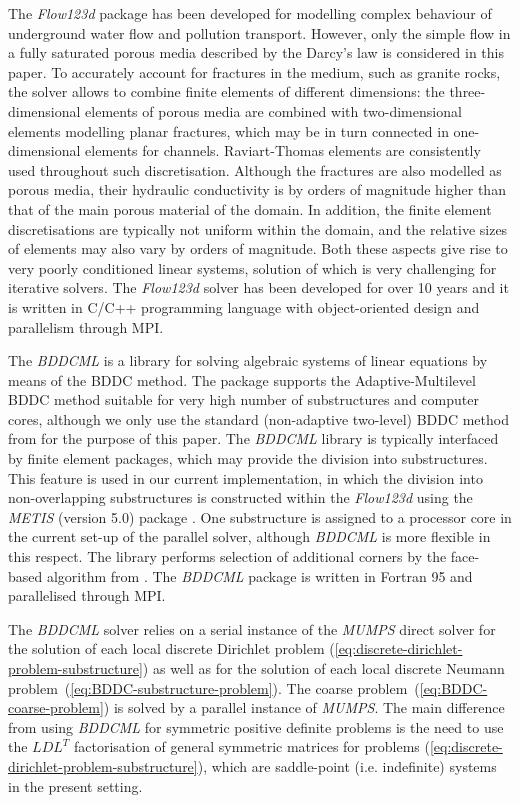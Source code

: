 The \textsl{Flow123d} package has been developed for modelling complex
behaviour of underground water flow and pollution transport. However, only the
simple flow in a fully saturated porous media described by the Darcy's law is
considered in this paper. To accurately account for fractures in the medium,
such as granite rocks, the solver allows to combine finite elements of
different dimensions: the three-dimensional elements of porous media are
combined with two-dimensional elements modelling planar fractures, which may be in
turn connected in one-dimensional elements for channels. Raviart-Thomas
elements are consistently used throughout such discretisation. Although the
fractures are also modelled as porous media, their hydraulic conductivity is by
orders of magnitude higher than that of the main porous material of the
domain. In addition, the finite element discretisations are typically not
uniform within the domain, and the relative sizes of elements may also vary by
orders of magnitude. Both these aspects give rise to very poorly conditioned
linear systems, solution of which is very challenging for iterative solvers.
The \textsl{Flow123d} solver has been developed for over 10 years and it is
written in C/C++ programming language with object-oriented design and
parallelism through MPI.

The \textsl{BDDCML} is a library for solving algebraic systems of linear
equations by means of the BDDC method. The package supports the
Adaptive-Multilevel BDDC method \cite{Sousedik-2013-AMB} suitable for very
high number of substructures and computer cores, although we only use the
standard (non-adaptive two-level) BDDC method from
\cite{Tu-2007-BAF,Dohrmann-2003-PSC} for the purpose of this paper. The
\textsl{BDDCML} library is typically interfaced by finite element packages,
which may provide the division into substructures. This feature is used in our
current implementation, in which the division into non-overlapping
substructures is constructed within the \textsl{Flow123d} using the
\textsl{METIS} (version 5.0) package \cite{Karypis-1998-FHQ}. One substructure
is assigned to a processor core in the current set-up of the parallel solver,
although \textsl{BDDCML} is more flexible in this respect. The library
performs selection of additional corners by the face-based algorithm from
\cite{Sistek-2012-FSC}. The \textsl{BDDCML} package is written in Fortran 95
and parallelised through MPI.

The \textsl{BDDCML} solver relies on a serial instance of the \textsl{MUMPS}
direct solver \cite{Amestoy-2000-MPD} for the solution of each local discrete
Dirichlet problem (\ref{eq:discrete-dirichlet-problem-substructure}) as well
as for the solution of each local discrete Neumann
problem~(\ref{eq:BDDC-substructure-problem}). The coarse
problem~(\ref{eq:BDDC-coarse-problem}) is solved by a parallel instance of
\textsl{MUMPS}. The main difference from using \textsl{BDDCML} for symmetric
positive definite problems is the need to use the $LDL^{T}$ factorisation of
general symmetric matrices for problems
(\ref{eq:discrete-dirichlet-problem-substructure}), which are saddle-point
(i.e. indefinite) systems in the present setting.

